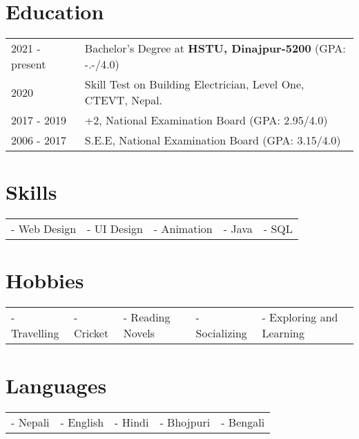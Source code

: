 \documentclass[a4paper,12pt]{article}
\begin{document}
\section{Education}
\begin{tabularx}{\linewidth}{@{}l X@{}}	
2021 - present & Bachelor's Degree at \textbf{HSTU, Dinajpur-5200} \hfill \normalsize (GPA: -.-/4.0) \\

2020 & Skill Test on Building Electrician, Level One, CTEVT, Nepal.  \\ 

2017 - 2019 & +2, National Examination Board \hfill  (GPA: 2.95/4.0) \\

2006 - 2017 & S.E.E, National Examination Board \hfill  (GPA: 3.15/4.0) \\
\end{tabularx}

\section{Skills}
\begin{tabularx}{\linewidth}{@{}l l l l l@{}}
- Web Design &  - UI Design &  - Animation  &  - Java  &  - SQL\\  
\end{tabularx}

\section{Hobbies}
\begin{tabularx}{\linewidth}{@{}l l l l l@{}}
- Travelling &  - Cricket &  - Reading Novels  &  - Socializing  &  - Exploring and Learning\\  
\end{tabularx}

\section{Languages}
\begin{tabularx}{\linewidth}{@{}l l l l l@{}}
- Nepali &  - English &  - Hindi  &  - Bhojpuri  &  - Bengali\\  
\end{tabularx}
\end{document}
